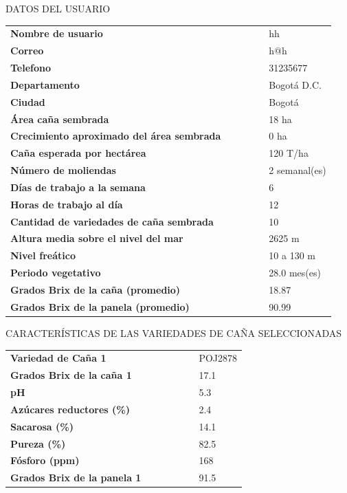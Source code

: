 \documentclass{article}%
\begin{document}
\newpage%
\begin{center}%
\begin{Huge}%
DATOS DEL USUARIO%
\end{Huge}%
\linebreak%
\end{center}%
\begin{tabular}{lccccl}%
\textbf{Nombre de usuario}& & & & &hh\\%
\textbf{Correo}& & & & &h@h\\%
\textbf{Telefono}& & & & &31235677\\%
\textbf{Departamento}& & & & &Bogotá D.C.\\%
\textbf{Ciudad}& & & & &Bogotá\\%
\textbf{Área caña sembrada}& & & & &18 ha\\%
\textbf{Crecimiento aproximado del área sembrada}& & & & &0 ha\\%
\textbf{Caña esperada por hectárea}& & & & &120 T/ha\\%
\textbf{Número de moliendas}& & & & &2 semanal(es)\\%
\textbf{Días de trabajo a la semana}& & & & &6\\%
\textbf{Horas de trabajo al día}& & & & &12\\%
\textbf{Cantidad de variedades de caña sembrada}& & & & &10\\%
\textbf{Altura media sobre el nivel del mar}& & & & &2625 m\\%
\textbf{Nivel freático}& & & & &10 a 130 m\\%
\textbf{Periodo vegetativo}& & & & &28.0 mes(es)\\%
\textbf{Grados Brix de la caña (promedio)}& & & & &18.87\\%
\textbf{Grados Brix de la panela (promedio)}& & & & &90.99\\%
\end{tabular}%
\newpage%
\begin{center}%
\begin{Huge}%
CARACTERÍSTICAS DE LAS VARIEDADES DE CAÑA SELECCIONADAS%
\end{Huge}%
\linebreak%
\end{center}%
\begin{tabular}{lcccccl}%
\textbf{Variedad de Caña 1}& & & & & &POJ2878\\%
\textbf{Grados Brix de la caña 1}& & & & & &17.1\\%
\textbf{pH}& & & & & &5.3\\%
\textbf{Azúcares reductores (\%)}& & & & & &2.4\\%
\textbf{Sacarosa (\%)}& & & & & &14.1\\%
\textbf{Pureza (\%)}& & & & & &82.5\\%
\textbf{Fósforo (ppm)}& & & & & &168\\%
\textbf{Grados Brix de la panela 1}& & & & & &91.5\\%
\end{tabular}%
\end{document}
